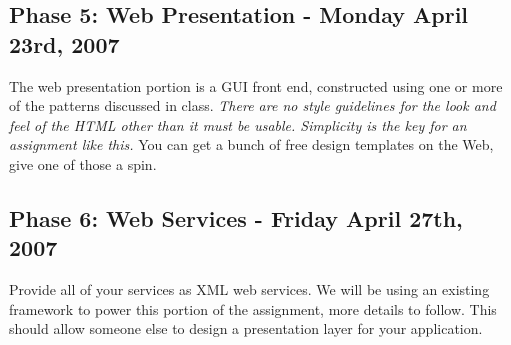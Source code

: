 \documentclass[11pt]{exam}
\begin{document}
\subsection{Phase 5: Web Presentation - Monday April 23rd, 2007 }
The web presentation portion is a GUI front end, constructed using one or more of the patterns discussed in class.     {\it There are no style guidelines for the look and feel of the HTML other than it must be usable.  Simplicity is the key for an assignment like this.}   You can get a bunch of free design templates on the Web, give one of those a spin.

\subsection{Phase 6: Web Services - Friday April 27th, 2007 }
Provide all of your services as XML web services.   We will be using an existing framework to power this portion of the assignment, more details to follow.  This should allow someone else to design a presentation layer for your application.
\end{document}
